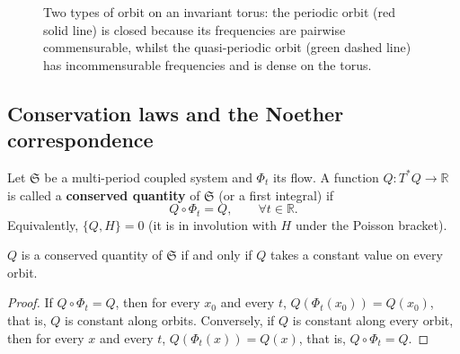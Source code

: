 \begin{figure}[htbp]
\centering
{}
\caption{Two types of orbit on an invariant torus: the periodic orbit (red solid line) is closed because its frequencies are pairwise commensurable, whilst the quasi-periodic orbit (green dashed line) has incommensurable frequencies and is dense on the torus.}
\label{fig:ps_invariant_torus}
\end{figure}

\subsection{Conservation laws and the Noether correspondence}\label{subsec:ps_noether_correspondence}

\begin{definition}\label{def:ps_conserved_quantity}
Let $\mathfrak{S}$ be a multi-period coupled system and $\Phi_t$ its flow. A function $Q:T^*Q\to\mathbb{R}$ is called a \textbf{conserved quantity} of $\mathfrak{S}$ (or a first integral) if
\[
Q\circ \Phi_t = Q, \qquad \forall t\in\mathbb{R}.
\]
Equivalently, $\{Q,H\} = 0$ (it is in involution with $H$ under the Poisson bracket).
\end{definition}

\begin{lemma}\label{lem:ps_conserved_quantity_characterisation}
$Q$ is a conserved quantity of $\mathfrak{S}$ if and only if $Q$ takes a constant value on every orbit.
\end{lemma}

\begin{proof}
If $Q\circ\Phi_t=Q$, then for every $x_0$ and every $t$, $Q(\Phi_t(x_0))=Q(x_0)$, that is, $Q$ is constant along orbits. Conversely, if $Q$ is constant along every orbit, then for every $x$ and every $t$, $Q(\Phi_t(x))=Q(x)$, that is, $Q\circ\Phi_t=Q$.
\end{proof}

